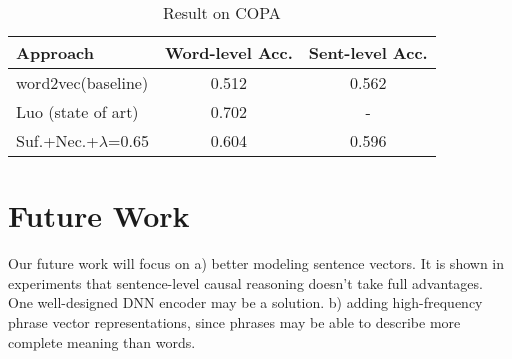 \documentclass[conference]{IEEEtran}
\begin{document}
\begin{table}[!ht]
	\caption{Result on COPA}
	\label{table1}
	\centering
	\begin{tabular}{|l|c|c|}
		\hline 
		Approach & Word-level Acc. & Sent-level Acc. \\
		\hline
		word2vec(baseline)  & 0.512 & 0.562\\
		\hline
		Luo \cite{kr2016} (state of art) & 0.702 & - \\
		\hline
		Suf.+Nec.+$\lambda$=0.65 & 0.604 & 0.596 \\
		\hline 
	\end{tabular}
\end{table}



\section{Future Work}
Our future work will focus on  a) better modeling sentence vectors. It is shown in experiments that sentence-level causal reasoning doesn't take full advantages. One well-designed DNN encoder may be a solution.  b) adding high-frequency phrase vector representations, since phrases may be able to describe more complete meaning than words.














\end{document}
